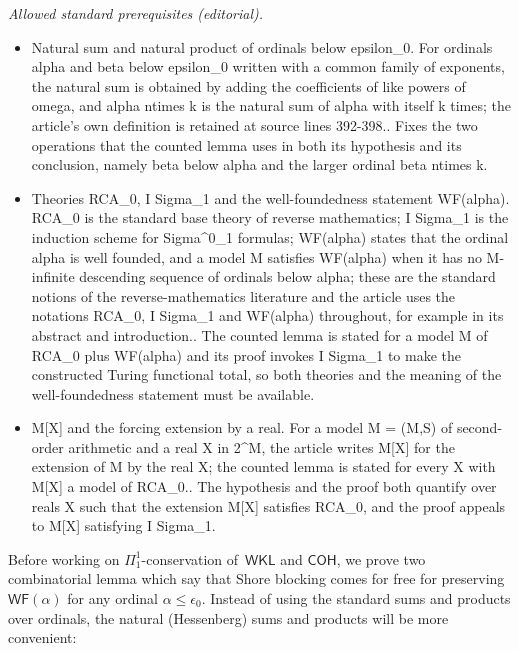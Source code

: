 \documentclass{article}
\numberwithin{theorem}{section}
\newcommand{\WKL}{\mathsf{WKL}}
\newcommand{\COH}{\mathsf{COH}}
\newcommand{\WF}{\mathsf{WF}}
\begin{document}
\noindent\textit{Allowed standard prerequisites (editorial).}\begin{itemize}
\item Natural sum and natural product of ordinals below epsilon\_0. For ordinals alpha and beta below epsilon\_0 written with a common family of exponents, the natural sum is obtained by adding the coefficients of like powers of omega, and alpha ntimes k is the natural sum of alpha with itself k times; the article's own definition is retained at source lines 392-398.. Fixes the two operations that the counted lemma uses in both its hypothesis and its conclusion, namely beta below alpha and the larger ordinal beta ntimes k.
\item Theories RCA\_0, I Sigma\_1 and the well-foundedness statement WF(alpha). RCA\_0 is the standard base theory of reverse mathematics; I Sigma\_1 is the induction scheme for Sigma\textasciicircum{}0\_1 formulas; WF(alpha) states that the ordinal alpha is well founded, and a model M satisfies WF(alpha) when it has no M-infinite descending sequence of ordinals below alpha; these are the standard notions of the reverse-mathematics literature and the article uses the notations RCA\_0, I Sigma\_1 and WF(alpha) throughout, for example in its abstract and introduction.. The counted lemma is stated for a model M of RCA\_0 plus WF(alpha) and its proof invokes I Sigma\_1 to make the constructed Turing functional total, so both theories and the meaning of the well-foundedness statement must be available.
\item M[X] and the forcing extension by a real. For a model M = (M,S) of second-order arithmetic and a real X in 2\textasciicircum{}M, the article writes M[X] for the extension of M by the real X; the counted lemma is stated for every X with M[X] a model of RCA\_0.. The hypothesis and the proof both quantify over reals X such that the extension M[X] satisfies RCA\_0, and the proof appeals to M[X] satisfying I Sigma\_1.
\end{itemize}\medskip
Before working on $\Pi^1_1$-conservation of~$\WKL$ and $\COH$, we prove two combinatorial lemma which say that Shore blocking comes for free for preserving $\WF(\alpha)$ for any ordinal $\alpha \leq \epsilon_0$. Instead of using the standard sums and products over ordinals, the natural (Hessenberg) sums and products will be more convenient:
\end{document}
